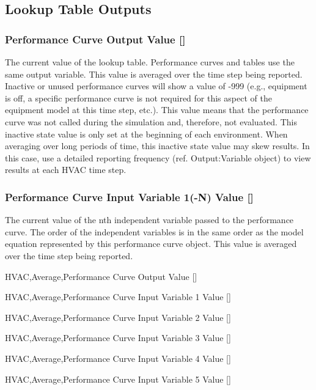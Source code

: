 \subsection{Lookup Table Outputs}\label{lookup-table-outputs}

\subsubsection{Performance Curve Output Value {[]}}\label{performance-curve-output-value-2}

The current value of the lookup table. Performance curves and tables use the same output variable. This value is averaged over the time step being reported. Inactive or unused performance curves will show a value of -999 (e.g., equipment is off, a specific performance curve is not required for this aspect of the equipment model at this time step, etc.). This value means that the performance curve was not called during the simulation and, therefore, not evaluated. This inactive state value is only set at the beginning of each environment. When averaging over long periods of time, this inactive state value may skew results. In this case, use a detailed reporting frequency (ref. Output:Variable object) to view results at each HVAC time step.

\subsubsection{Performance Curve Input Variable 1(-N) Value {[]}}\label{performance-curve-input-variable-1-n-value-000}

The current value of the nth independent variable passed to the performance curve. The order of the independent variables is in the same order as the model equation represented by this performance curve object. This value is averaged over the time step being reported.

HVAC,Average,Performance Curve Output Value {[]}

HVAC,Average,Performance Curve Input Variable 1 Value {[]}

HVAC,Average,Performance Curve Input Variable 2 Value {[]}

HVAC,Average,Performance Curve Input Variable 3 Value {[]}

HVAC,Average,Performance Curve Input Variable 4 Value {[]}

HVAC,Average,Performance Curve Input Variable 5 Value {[]}
